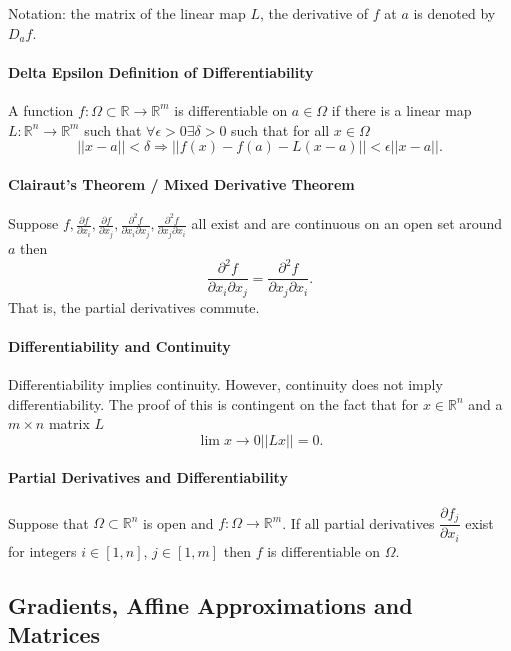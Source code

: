 Notation: the matrix of the linear map \(L\), the derivative of \(f\) at
\(a\) is denoted by \(D_af\).

\paragraph{Delta Epsilon Definition of Differentiability}
A function \(f: \Omega\subset \mathbb{R}\to \mathbb{R}^m\) is 
differentiable on \(a\in \Omega\) if there is a linear map \(L: \mathbb{R}^n\to \mathbb{R}^m\)
such that \(\forall \epsilon > 0 \exists \delta > 0 \)
such that for all \(x\in \Omega\)
\[
\left|\left|x - a\right|\right| < \delta
\Rightarrow
\left|\left|f(x) - f(a) - L(x-a)\right|\right|
< \epsilon\left|\left|x - a\right|\right|. 
\]

\paragraph{Clairaut's Theorem / Mixed Derivative Theorem}
Suppose \(
f, \frac{\partial f}{\partial x_i}, \frac{\partial f}{\partial x_j},
    \frac{\partial^2 f}{\partial x_i \partial x_j},
    \frac{\partial^2 f}{\partial x_j \partial x_i}
\)
all exist and are continuous on an open set around \(a\) then
\[
    \frac{\partial^2 f}{\partial x_i \partial x_j}
    =
    \frac{\partial^2 f}{\partial x_j \partial x_i}.
\]
That is, the partial derivatives commute.

\paragraph{Differentiability and Continuity} Differentiability implies continuity.
However, continuity does not imply differentiability.
The proof of this is contingent on the fact that for \(x\in \mathbb{R}^n\)
and a \(m\times n\) matrix \(L\)
\[\lim x\to 0 \left|\left|Lx\right|\right| = 0.\]

\paragraph{Partial Derivatives and Differentiability}
Suppose that \(\Omega\subset \mathbb{R}^n\) is open and \(f: \Omega \to \mathbb{R}^m\).
If all partial derivatives \(\dfrac{\partial f_j}{\partial x_i}\) exist
for integers \(i \in [1, n]\), \(j\in [1, m]\) then
\(f\) is differentiable on \(\Omega\).

\subsection{Gradients, Affine Approximations and Matrices}

